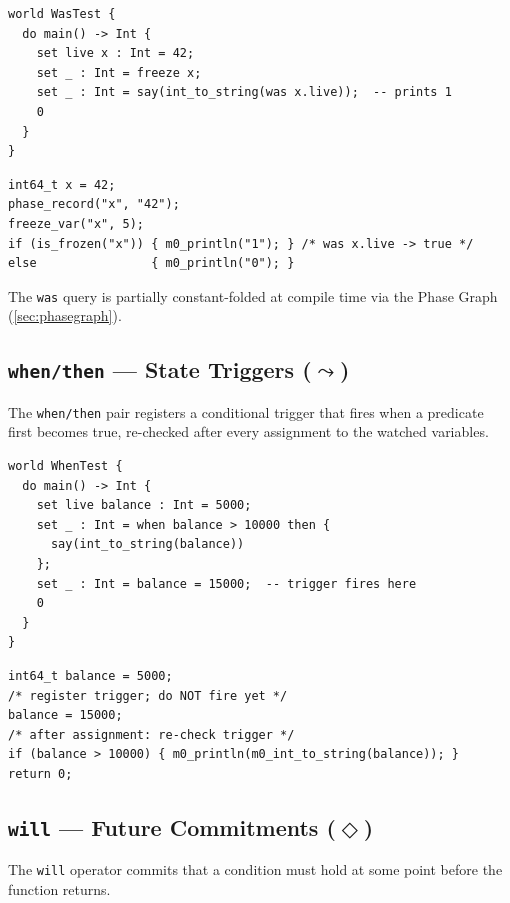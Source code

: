 \documentclass[11pt,a4paper]{article}
\begin{document}
\begin{lstlisting}[style=Mn,caption={was example.}]
world WasTest {
  do main() -> Int {
    set live x : Int = 42;
    set _ : Int = freeze x;
    set _ : Int = say(int_to_string(was x.live));  -- prints 1
    0
  }
}
\end{lstlisting}

\begin{lstlisting}[style=C,caption={Generated C for was.},numbers=none]
int64_t x = 42;
phase_record("x", "42");
freeze_var("x", 5);
if (is_frozen("x")) { m0_println("1"); } /* was x.live -> true */
else                { m0_println("0"); }
\end{lstlisting}

The \texttt{was} query is partially constant-folded at compile time via the Phase Graph
(\cref{sec:phasegraph}).

\subsection{\texttt{when/then} --- State Triggers ($\leadsto$)}
\label{sec:when}

The \texttt{when/then} pair registers a conditional trigger that fires when a predicate first
becomes true, re-checked after every assignment to the watched variables.

\begin{lstlisting}[style=Mn,caption={when/then example.}]
world WhenTest {
  do main() -> Int {
    set live balance : Int = 5000;
    set _ : Int = when balance > 10000 then {
      say(int_to_string(balance))
    };
    set _ : Int = balance = 15000;  -- trigger fires here
    0
  }
}
\end{lstlisting}

\begin{lstlisting}[style=C,caption={Generated C for when/then.},numbers=none]
int64_t balance = 5000;
/* register trigger; do NOT fire yet */
balance = 15000;
/* after assignment: re-check trigger */
if (balance > 10000) { m0_println(m0_int_to_string(balance)); }
return 0;
\end{lstlisting}

\subsection{\texttt{will} --- Future Commitments ($\Diamond$)}
\label{sec:will}

The \texttt{will} operator commits that a condition must hold at some point before the function
returns.
\end{document}
